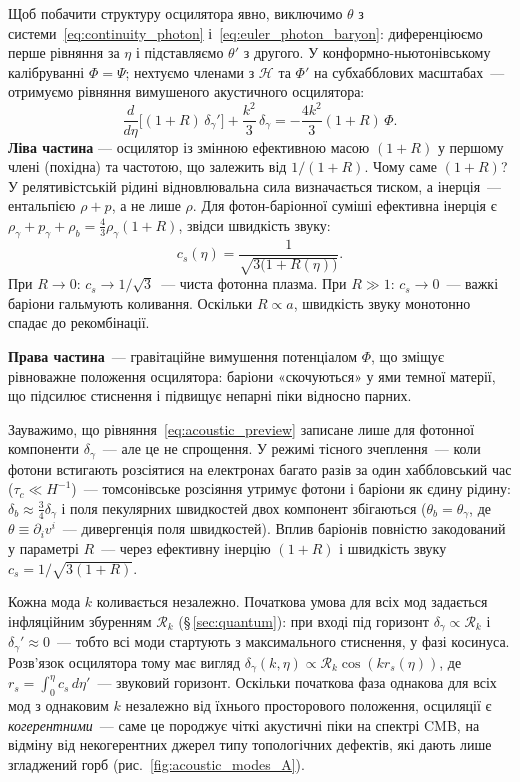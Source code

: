Щоб побачити структуру осцилятора явно, виключимо
$\theta$ з системи~\eqref{eq:continuity_photon}
і~\eqref{eq:euler_photon_baryon}: диференціюємо перше
рівняння за $\eta$ і підставляємо $\theta'$ з другого.
У конформно-ньютонівському калібруванні $\Phi = \Psi$;
нехтуємо членами з $\mathcal{H}$ та $\Phi'$ на субхабблових
масштабах~--- отримуємо рівняння вимушеного акустичного
осцилятора:
\begin{equation}\label{eq:acoustic_preview}
  \frac{d}{d\eta}\bigl[(1+R)\,\delta_\gamma'\bigr]
  + \frac{k^2}{3}\,\delta_\gamma
  = -\frac{4k^2}{3}(1+R)\,\Phi.
\end{equation}
\textbf{Ліва частина} --- осцилятор із змінною ефективною масою
$(1+R)$ у першому члені (похідна) та частотою, що залежить
від $1/(1+R)$.
Чому саме $(1+R)$? У релятивістській рідині
відновлювальна сила визначається тиском, а інерція~---
ентальпією $\rho + p$, а не лише $\rho$.
Для фотон-баріонної суміші ефективна інерція є
$\rho_\gamma + p_\gamma + \rho_b = \tfrac{4}{3}\rho_\gamma(1+R)$,
звідси швидкість звуку:
\begin{equation}\label{eq:sound_speed}
  c_s(\eta) = \frac{1}{\sqrt{3\bigl(1+R(\eta)\bigr)}}.
\end{equation}
При $R \to 0$: $c_s \to 1/\sqrt{3}$~--- чиста фотонна
плазма. При $R \gg 1$: $c_s \to 0$~--- важкі баріони
гальмують коливання. Оскільки $R \propto a$, швидкість
звуку монотонно спадає до рекомбінації.

\textbf{Права частина}~--- гравітаційне вимушення
потенціалом $\Phi$, що зміщує рівноважне положення
осцилятора: баріони «скочуються» у ями темної матерії,
що підсилює стиснення і підвищує непарні піки відносно
парних.

Зауважимо, що рівняння~\eqref{eq:acoustic_preview}
записане лише для фотонної компоненти $\delta_\gamma$~---
але це не спрощення.
У режимі тісного зчеплення~--- коли фотони встигають
розсіятися на електронах багато разів за один
хаббловський час ($\tau_c \ll H^{-1}$)~--- томсонівське розсіяння утримує
фотони і баріони як єдину рідину:
$\delta_b \approx \tfrac{3}{4}\delta_\gamma$  і
поля пекулярних швидкостей двох компонент збігаються
($\theta_b = \theta_\gamma$, де $\theta \equiv \partial_i v^i$~---
дивергенція поля швидкостей). Вплив баріонів
повністю закодований у параметрі $R$~--- через
ефективну інерцію $(1+R)$ і швидкість звуку
$c_s = 1/\sqrt{3(1+R)}$.

Кожна мода $k$ коливається незалежно. Початкова умова
для всіх мод задається інфляційним збуренням $\mathcal{R}_k$  (§\,\ref{sec:quantum}):
при вході під горизонт $\delta_\gamma \propto \mathcal{R}_k$
і $\delta_\gamma' \approx 0$~--- тобто всі моди стартують
з максимального стиснення, у фазі косинуса.
Розв'язок осцилятора тому має вигляд
$\delta_\gamma(k,\eta) \propto \mathcal{R}_k\cos(k r_s(\eta))$,
де $r_s = \int_0^\eta c_s\,d\eta'$~--- звуковий горизонт.
Оскільки початкова фаза однакова для всіх мод з однаковим $k$
незалежно від їхнього просторового положення, осциляції є
\emph{когерентними}~--- саме це породжує чіткі акустичні
піки на спектрі CMB, на відміну від некогерентних джерел
типу топологічних дефектів, які дають лише згладжений горб
(рис.~\ref{fig:acoustic_modes_A}).

